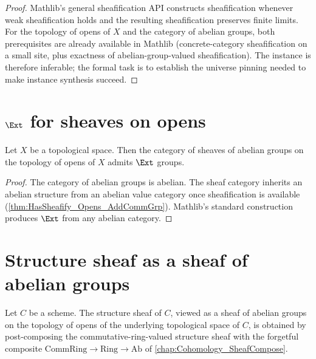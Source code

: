 \begin{proof}


\leanok
  Mathlib's general sheafification API constructs sheafification whenever weak sheafification holds and the resulting sheafification preserves finite limits. For the topology of opens of \(X\) and the category of abelian groups, both prerequisites are already available in Mathlib (concrete-category sheafification on a small site, plus exactness of abelian-group-valued sheafification). The instance is therefore inferable; the formal task is to establish the universe pinning needed to make instance synthesis succeed.
\end{proof}

\section{\(\Ext\) for sheaves on opens}

\begin{theorem}
  \label{thm:HasExt_Sheaf_Opens_AddCommGrp}

  Let \(X\) be a topological space. Then the category of sheaves of abelian groups on the topology of opens of \(X\) admits \(\Ext\) groups.
\end{theorem}

\begin{proof}


\leanok
  The category of abelian groups is abelian. The sheaf category inherits an abelian structure from an abelian value category once sheafification is available (\cref{thm:HasSheafify_Opens_AddCommGrp}). Mathlib's standard construction produces \(\Ext\) from any abelian category.
\end{proof}

\section{Structure sheaf as a sheaf of abelian groups}

\begin{definition}
  \label{def:Scheme_toAbSheaf}

  Let \(C\) be a scheme. The structure sheaf of \(C\), viewed as a sheaf of abelian groups on the topology of opens of the underlying topological space of \(C\), is obtained by post-composing the commutative-ring-valued structure sheaf with the forgetful composite \(\mathrm{CommRing} \to \mathrm{Ring} \to \mathrm{Ab}\) of \cref{chap:Cohomology_SheafCompose}.
\end{definition}

